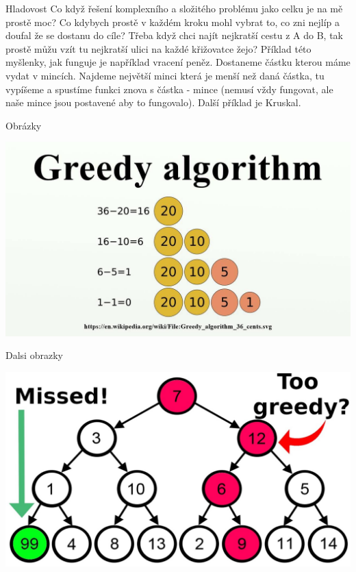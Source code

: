 \documentclass{beamer}
\begin{document}
\begin{frame}{Hladovost}
 Co když řešení komplexního a složitého problému jako celku je na mě prostě moc?
 Co kdybych prostě v každém kroku mohl vybrat to, co zni nejlíp a doufal že se
 dostanu do cíle?
\vfill
 Třeba když chci najít nejkratší cestu z A do B, tak prostě můžu vzít tu
 nejkratší ulici na každé křižovatce žejo?
\vfill
 Příklad této myšlenky, jak funguje je například vracení peněz. Dostaneme částku
 kterou máme vydat v mincích. Najdeme největší minci která je menší než daná
 částka, tu vypíšeme a spustíme funkci znova s částka - mince (nemusí vždy
 fungovat, ale naše mince jsou postavené aby to fungovalo). Další příklad je
 Kruskal.
  
\end{frame}

\begin{frame}{Obrázky}
 
 \includegraphics[scale=0.3]{greedy3.jpg}
\end{frame}

\begin{frame}{Dalsi obrazky}
 
 \includegraphics[scale=0.25]{greedy2.jpg}
\end{frame}
\end{document}
